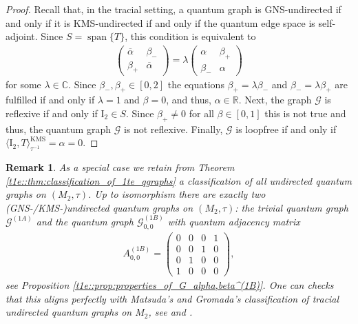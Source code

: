 \documentclass{amsart}
\newtheorem{remark}[thm]{Remark}
\newcommand{\R}{\mathbb{R}}
\newcommand{\C}{\mathbb{C}}
\DeclareMathOperator{\spann}{span}
\DeclareMathOperator{\KMS}{KMS}
\begin{document}
\begin{proof}
    Recall that, in the tracial setting, a quantum graph is GNS-undirected if and only if it is KMS-undirected if and only if the quantum edge space is self-adjoint. 
    Since $S = \spann\{T\}$, this condition is equivalent to
    \begin{align*}
        \begin{pmatrix}
            \overline{\alpha}&\beta_-\\
            \beta_+&\overline{\alpha}
        \end{pmatrix}
        =\lambda
        \begin{pmatrix}
            \alpha&\beta_+\\
            \beta_-&\alpha
        \end{pmatrix}
    \end{align*}
    for some $\lambda\in\C$.
    Since $\beta_-,\beta_+\in[0,2]$ the equations $\beta_+=\lambda\beta_-$ and $\beta_-=\lambda\beta_+$ are fulfilled if and only if $\lambda=1$ and $\beta=0$, and thus, $\alpha\in\R$.
    Next, the graph $\mathcal{G}$ is reflexive if and only if $\mathrm{I}_2\in S$. Since $\beta_+\neq0$ for all $\beta\in[0,1]$ this is not true and thus, the quantum graph $\mathcal{G}$ is not reflexive. Finally, $\mathcal{G}$ is loopfree if and only if $\langle\mathrm{I}_2,T\rangle_{\tau^{-1}}^{\KMS}=\alpha=0$.
\end{proof}


\begin{remark}
    As a special case we retain from Theorem \ref{t1e::thm:classification_of_1te_qgraphs} a classification of all undirected quantum graphs on $(M_2, \tau)$. Up to isomorphism there are exactly two (GNS-/KMS-)undirected quantum graphs on $(M_2, \tau)$: the trivial quantum graph $\mathcal{G}^{(1A)}$ and the quantum graph $\mathcal{G}^{(1B)}_{0,0}$ with quantum adjacency matrix
    \begin{align*}
        A_{0,0}^{(1B)}=
        \begin{pmatrix}
            0 &0 &0 &1 \\
            0 &0 &1 &0 \\
            0 &1 &0 &0 \\
            1 &0 &0 &0
        \end{pmatrix},
    \end{align*}
    see Proposition \ref{t1e::prop:properties_of_G_alpha,beta^(1B)}. One can checks that this aligns perfectly with Matsuda's and Gromada's classification of tracial undirected quantum graphs on $M_2$, see \cite[Theorem 3.1]{matsuda_classification_2022} and \cite[Theorem 3.11]{gromada_examples_2022}.
\end{remark}
\end{document}
